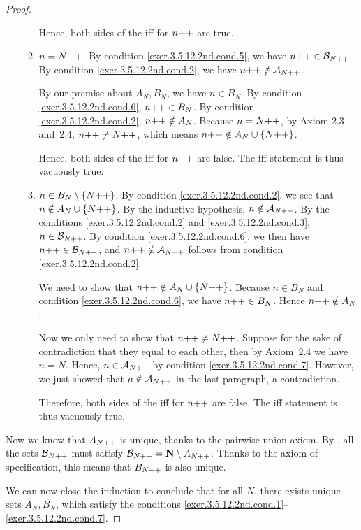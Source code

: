 \begin{proof}
\begin{enumerate}
\begin{enumerate}
			Hence, both sides of the iff for $n{+}{+}$ are true.
			
			\item $n = N{+}{+}$. By condition \ref{exer.3.5.12.2nd.cond.5}, we have $n{+}{+} \in {\cal B}_{N{+}{+}}$. By condition \ref{exer.3.5.12.2nd.cond.2}, we have $n{+}{+} \notin {\cal A}_{N{+}{+}}$. 
			
			By our premise about $A_N,B_N$, we have $n \in B_N$. By condition \ref{exer.3.5.12.2nd.cond.6}, $n{+}{+} \in B_N$. By condition \ref{exer.3.5.12.2nd.cond.2}, $n{+}{+} \notin A_N$. Because $n = N{+}{+}$, by Axiom 2.3 and~2.4, $n{+}{+} \ne N{+}{+}$, which means $n{+}{+} \notin A_N \cup \{N{+}{+}\}$.
			
			Hence, both sides of the iff for $n{+}{+}$ are false. The iff statement is thus vacuously true.
			
			\item $n \in B_N \setminus \{N{+}{+}\}$. By condition \ref{exer.3.5.12.2nd.cond.2}, we see that $n \notin A_N \cup \{N{+}{+}\}$. By the inductive hypothesis, $n \notin {\cal A}_{N{+}{+}}$. By the conditions \ref{exer.3.5.12.2nd.cond.2} and \ref{exer.3.5.12.2nd.cond.3}, $n \in {\cal B}_{N{+}{+}}$. By condition \ref{exer.3.5.12.2nd.cond.6}, we then have $n{+}{+} \in {\cal B}_{N{+}{+}}$, and $n{+}{+} \notin {\cal A}_{N{+}{+}}$ follows from condition \ref{exer.3.5.12.2nd.cond.2}.
			
			We need to show that $n{+}{+} \notin A_N \cup \{N{+}{+}\}$. Because $n \in B_N$ and condition \ref{exer.3.5.12.2nd.cond.6}, we have $n{+}{+} \in B_N$. Hence $n{+}{+} \notin A_N$.
			
			Now we only need to show that $n{+}{+} \ne N{+}{+}$. Suppose for the sake of contradiction that they equal to each other, then by Axiom~2.4 we have $n = N$. Hence, $n \in {\cal A}_{N{+}{+}}$ by condition \ref{exer.3.5.12.2nd.cond.7}. However, we just showed that $a \notin {\cal A}_{N{+}{+}}$ in the last paragraph, a contradiction.
			
			Therefore, both sides of the iff for $n{+}{+}$ are false. The iff statement is thus vacuously true.
		\end{enumerate}
	\end{enumerate}

	Now we know that $A_{N{+}{+}}$ is unique, thanks to the pairwise union axiom. By , all the sets ${\cal B}_{N{+}{+}}$ must satisfy ${\cal B}_{N{+}{+}} = \mathbf{N} \setminus A_{N{+}{+}}$. Thanks to the axiom of specification, this means that $B_{N{+}{+}}$ is also unique.
	\endgroup
	
	We can now close the induction to conclude that for all $N$, there exists unique sets $A_N,B_N$, which satisfy the conditions \ref{exer.3.5.12.2nd.cond.1}--\ref{exer.3.5.12.2nd.cond.7}.
\end{proof}


